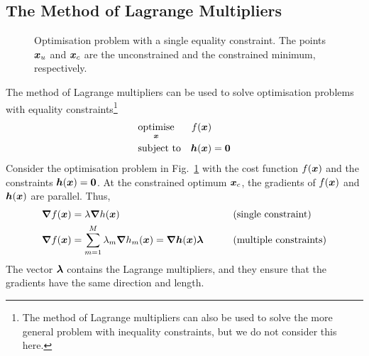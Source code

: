 \subsection{The Method of Lagrange Multipliers}
\begin{figure}[htbp]
  \centering
  \caption{Optimisation problem with a single equality constraint. The points $\boldsymbol{x}_u$ and $\boldsymbol{x}_c$ are the unconstrained and the constrained minimum, respectively.}
  \label{fig:const_opt}
\end{figure}
\noindent The method of Lagrange multipliers can be used to solve optimisation problems with equality constraints\footnote{The method of Lagrange multipliers can also be used to solve the more general problem with inequality constraints, but we do not consider this here.}
\begin{gather}
  \begin{alignedat}{2}
      &\underset{\boldsymbol{x}}{\text{optimise}} &\quad f(\boldsymbol{x}) &\\
      &\text{subject to}&\quad \boldsymbol{h}(\boldsymbol{x}) &= \boldsymbol{0}
  \end{alignedat}
  \label{eq:constr_opt}
\end{gather}
Consider the optimisation problem in Fig.~\ref{fig:const_opt} with the cost function $f(\boldsymbol{x})$ and the constraints $\boldsymbol{h}(\boldsymbol{x})=\boldsymbol{0}$. At the constrained optimum $\boldsymbol{x}_c$, the gradients of $f(\boldsymbol{x})$ and $\boldsymbol{h}(\boldsymbol{x})$ are parallel. Thus,
\begin{alignat*}{2}
  \boldsymbol{\nabla}f(\boldsymbol{x}) &= \lambda \boldsymbol{\nabla}h(\boldsymbol{x}) &\qquad &\text{(single constraint)}\\
  \boldsymbol{\nabla}f(\boldsymbol{x}) &= \sum_{m=1}^M\lambda_m \boldsymbol{\nabla}h_m(\boldsymbol{x})= \boldsymbol{\nabla}\boldsymbol{h}(\boldsymbol{x})\boldsymbol{\lambda} &\qquad &\text{(multiple constraints)}
\end{alignat*}
The vector $\boldsymbol{\lambda}$ contains the Lagrange multipliers, and they ensure that the gradients have the same direction and length.

